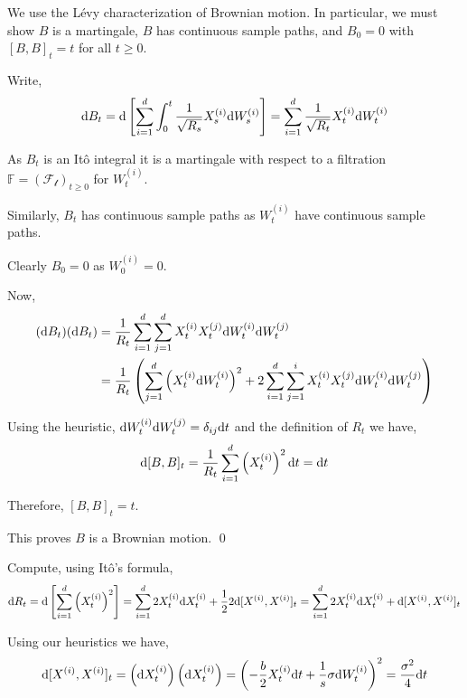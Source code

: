 \begin{solution}[Solution]
We use the  L\'evy characterization of Brownian motion. In particular, we must show \( B \) is a martingale, \( B \) has continuous sample paths, and \( B_0 = 0 \) with \( [B,B]_t = t \) for all \( t\geq 0 \).

Write,
\begin{align*}
    \mathrm{d} B_t = \mathrm{d} \left[ \sum_{i=1}^{d} \int_{0}^{t} \dfrac{1}{\sqrt{R_s}}X_s^{(i)} \mathrm{d} W_s^{(i)} \right] = \sum_{i=1}^{d} \dfrac{1}{\sqrt{R_t}}X_t^{(i)} \mathrm{d} W_t^{(i)}
\end{align*}


As \( B_t \) is an It\^o integral it is a martingale with respect to a filtration \( \mathbb{F} = ( \mathcal{F_t} )_{t\geq 0} \) for \( W_t^{(i)} \).

Similarly, \( B_t \) has continuous sample paths as \( W_t^{(i)} \) have continuous sample paths.

Clearly \( B_0 = 0 \) as \( W_0^{(i)} = 0 \).

Now, 
\begin{align*}
    (\mathrm{d} B_t)(\mathrm{d} B_t) &= \dfrac{1}{R_t} \sum_{i=1}^{d}\sum_{j=1}^{d}X_t^{(i)}X_t^{(j)} \mathrm{d} W_t^{(i)} \mathrm{d} W_t^{(j)} \\
    &= \dfrac{1}{R_t} \left( \sum_{j=1}^{d} \left(X_t^{(i)} \mathrm{d} W_t^{(i)}\right)^2  + 2\sum_{i=1}^{d}\sum_{j=1}^{i} X_t^{(i)}X_t^{(j)} \mathrm{d} W_t^{(i)} \mathrm{d} W_t^{(j)} \right) 
\end{align*}

Using the heuristic, \( \mathrm{d} W_t^{(i)} \mathrm{d} W_t^{(j)} = \delta_{ij} \mathrm{d} t \) and the definition of \( R_t \) we have,
\begin{align*}
    \mathrm{d}[B,B]_t = \dfrac{1}{R_t} \sum_{i=1}^{d} \left( X_t^{(i)} \right)^2 \mathrm{d} t = \mathrm{d} t
\end{align*}

Therefore, \( [B,B]_t = t \).

This proves \( B \) is a Brownian motion. \qed

Compute, using It\^o's formula,
\begin{align*}
    \mathrm{d} R_t 
    = \mathrm{d} \left[ \sum_{i=1}^{d} \left( X_t^{(i)} \right)^2 \right]
    = \sum_{i=1}^{d} 2 X_t^{(i)} \mathrm{d} X_t^{(i)} + \frac{1}{2} 2 \mathrm{d} [X^{(i)},X^{(i)}] _t 
    = \sum_{i=1}^{d} 2X_t^{(i)} \mathrm{d} X_t^{(i)} + \mathrm{d}[X^{(i)},X^{(i)}]_t
\end{align*}

Using our heuristics we have,
\begin{align*}
    \mathrm{d}[X^{(i)},X^{(i)}]_t = \left( \mathrm{d} X_t^{(i)} \right) \left(\mathrm{d} X_t^{(i)} \right) 
    = \left( -\dfrac{b}{2} X_t^{(i)} \mathrm{d} t + \dfrac{1}{s}\sigma \mathrm{d} W_t^{(i)} \right)^2 
    = \dfrac{\sigma^2}{4} \mathrm{d} t
\end{align*}


\end{solution}
